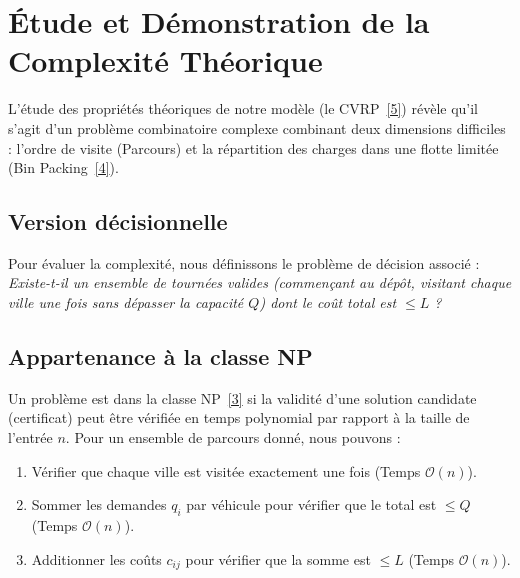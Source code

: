 \newpage

\section{Étude et Démonstration de la Complexité Théorique}

L'étude des propriétés théoriques de notre modèle (le CVRP~\hyperlink{ref:toth2014}{[5]}) révèle qu'il s'agit d'un problème combinatoire complexe combinant deux dimensions difficiles : l'ordre de visite (Parcours) et la répartition des charges dans une flotte limitée (Bin Packing~\hyperlink{ref:martello1990}{[4]}).

\subsection{Version décisionnelle}

Pour évaluer la complexité, nous définissons le problème de décision associé : \\
\textit{Existe-t-il un ensemble de tournées valides (commençant au dépôt, visitant chaque ville une fois sans dépasser la capacité $Q$) dont le coût total est $\leq L$ ?}

\subsection{Appartenance à la classe NP}

Un problème est dans la classe NP~\hyperlink{ref:garey1979}{[3]} si la validité d'une solution candidate (certificat) peut être vérifiée en temps polynomial par rapport à la taille de l'entrée $n$.
Pour un ensemble de parcours donné, nous pouvons :
\begin{enumerate}
    \item Vérifier que chaque ville est visitée exactement une fois (Temps $\mathcal{O}(n)$).
    \item Sommer les demandes $q_i$ par véhicule pour vérifier que le total est $\leq Q$ (Temps $\mathcal{O}(n)$).
    \item Additionner les coûts $c_{ij}$ pour vérifier que la somme est $\leq L$ (Temps $\mathcal{O}(n)$).
\end{enumerate}


